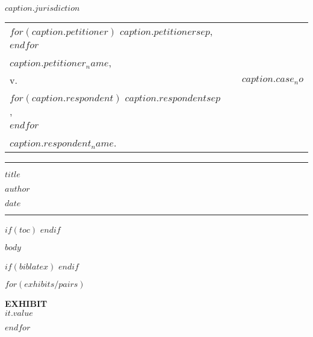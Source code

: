 \documentclass[12pt]{article}
\begin{document}
\thispagestyle{empty}
\begin{center}
    \textbf{\MakeUppercase{$caption.jurisdiction$}}
\end{center}

\setlength{\tabcolsep}{0em}
\setlength{\parindent}{0em}
\begin{tabular}{p{}|p{1em}p{}}
\vspace{1em}
    $for(caption.petitioner)$
    $caption.petitioner$$sep$,\\
    $endfor$ \\\\
    \textit{$caption.petitioner_name$}, & & \\
    \vspace{1em}
    v. & & $caption.case_no$ \\
    \vspace{1em}
    $for(caption.respondent)$
    $caption.respondent$$sep$,\\
    $endfor$ \\\\
    \textit{$caption.respondent_name$}. & &
\vspace{1em}
\end{tabular}
\setlength{\parindent}{0.5in}

\vspace{2em}

\onehalfspacing
\hrule
\begin{center}\bfseries
    \MakeUppercase{$title$}

    $author$

    $date$
\end{center}
\hrule

\clearpage
\doublespacing

$if(toc)$
\setcounter{tocdepth}{$toc-depth$}
\tableofcontents
\clearpage
$endif$

$body$

$if(biblatex)$
\printbibliography[heading=none]
$endif$

\renewcommand{\theexhibit}{\Alph{exhibit}}
$for(exhibits/pairs)$
\newpage
\thispagestyle{empty}
\vspace*{3in}
\begin{center}
    \label{exh:$it.key$}
    \noindent\Huge\bfseries
    EXHIBIT \theexhibit \\
    $it.value$
\end{center}
$endfor$
\end{document}
